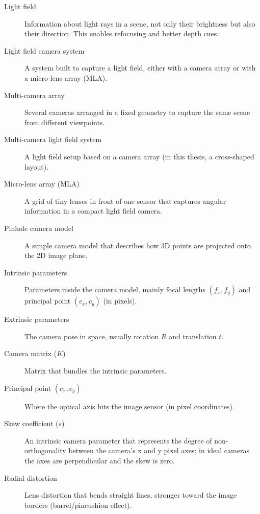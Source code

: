 \documentclass[12pt]{scrartcl}
\begin{document}
\begin{description}

\item[Light field]
Information about light rays in a scene, not only their brightness but also their direction. This enables refocusing and better depth cues.

\item[Light field camera system]
A system built to capture a light field, either with a camera array or with a micro-lens array (MLA).

\item[Multi-camera array]
Several cameras arranged in a fixed geometry to capture the same scene from different viewpoints.

\item[Multi-camera light field system]
A light field setup based on a camera array (in this thesis, a cross-shaped layout).

\item[Micro-lens array (MLA)]
A grid of tiny lenses in front of one sensor that captures angular information in a compact light field camera.

\item[Pinhole camera model]
A simple camera model that describes how 3D points are projected onto the 2D image plane.

\item[Intrinsic parameters]
Parameters inside the camera model, mainly focal lengths $(f_x,f_y)$ and principal point $(c_x,c_y)$ (in pixels).

\item[Extrinsic parameters]
The camera pose in space, usually rotation $R$ and translation $t$.

\item[Camera matrix ($K$)]
Matrix that bundles the intrinsic parameters.

\item[Principal point $(c_x,c_y)$]
Where the optical axis hits the image sensor (in pixel coordinates).

\item[Skew coefficient ($s$)]
An intrinsic camera parameter that represents the degree of non-orthogonality between the camera's x and y pixel axes; in ideal cameras the axes are perpendicular and the skew is zero.

\item[Radial distortion]
Lens distortion that bends straight lines, stronger toward the image borders (barrel/pincushion effect).


\end{description}
\end{document}
